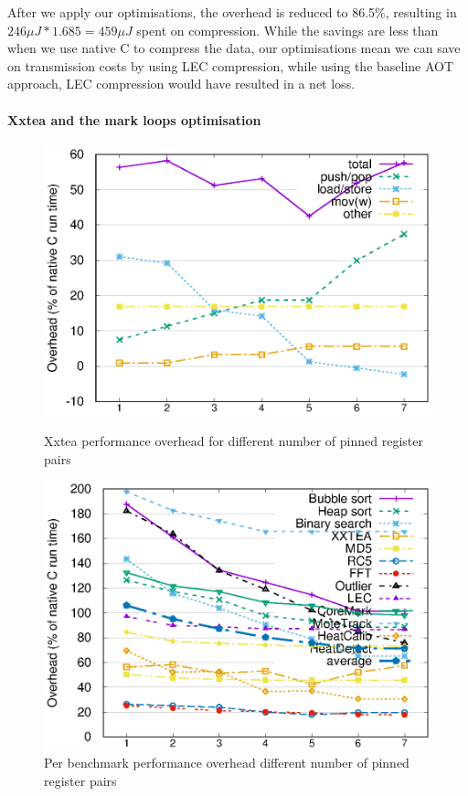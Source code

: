 After we apply our optimisations, the overhead is reduced to 86.5\%, resulting in $246 \mu J * 1.685 = 459 \mu J$ spent on compression. While the savings are less than when we use native C to compress the data, our optimisations mean we can save on transmission costs by using LEC compression, while using the baseline AOT approach, LEC compression would have resulted in a net loss.

\paragraph{Xxtea and the mark loops optimisation}
\begin{figure}
 \centering
 \begin{minipage}{0.45\textwidth}
  \centering
  \includegraphics[width=\myfiguresizexxtea]{pinnedregs-performance-xxtea.eps}
  \caption{Xxtea performance overhead for different number of pinned register pairs}
  \label{fig-performance-pinnedregs-xxtea-per-opcode-category}
 \end{minipage}\hfill
 \begin{minipage}{0.45\textwidth}
  \centering
  \includegraphics[width=\myfiguresizexxtea]{pinnedregs-performance-all-benchmarks.eps}
  \caption{Per benchmark performance overhead different number of pinned register pairs}
  \label{fig-performance-pinnedregs-per-benchmark}
 \end{minipage}
\end{figure}
